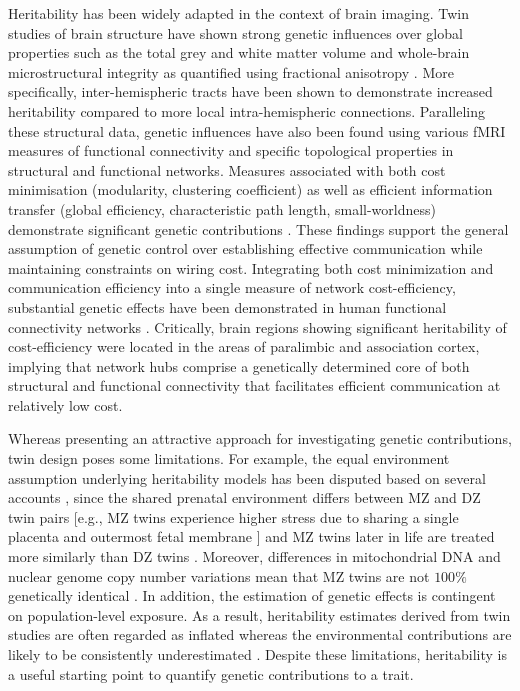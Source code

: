 Heritability has been widely adapted in the context of brain imaging. Twin studies of brain structure have shown strong genetic influences over global properties such as the total grey and white matter volume
\citep{Baare2001,Bohlken2014,Wright2002} and whole-brain microstructural integrity as quantified using fractional anisotropy \citep{Bohlken2014}. More specifically, inter-hemispheric tracts have been shown to demonstrate increased heritability \citep{Shen2014,Sudre2017} compared to more local intra-hemispheric connections. Paralleling these structural data, genetic influences have also been found using various fMRI measures of functional connectivity \citep{Colclough2017} \citep{Fu2015,Glahn2010,Sudre2017} and specific topological properties in structural \citep{Bohlken2014} and functional \citep{Fornito2011,Sinclair2015}  networks. Measures associated with both cost minimisation (modularity, clustering coefficient) as well as efficient information transfer (global efficiency, characteristic path length, small-worldness) demonstrate significant genetic contributions \citep{Sinclair2015,Bohlken2014}. These findings support the general assumption of genetic control over establishing effective communication while maintaining constraints on wiring cost. Integrating both cost minimization and communication efficiency into a single measure of network cost-efficiency, substantial genetic effects have been demonstrated in human functional connectivity networks \citep{Fornito2011}. Critically, brain regions showing significant heritability of cost-efficiency were located in the areas of paralimbic and association cortex, implying that network hubs comprise a genetically determined core of both structural and functional connectivity that facilitates efficient communication at relatively low cost.

Whereas presenting an attractive approach for investigating genetic contributions, twin design poses some limitations. For example, the equal environment assumption underlying heritability models has been disputed based on several accounts \citep{Charney2017,Joseph2002}, since the shared prenatal environment differs between MZ and DZ twin pairs [e.g., MZ twins experience higher stress due to sharing a single placenta and outermost fetal membrane \citep{Corsello2010}] and MZ twins later in life are treated more similarly than DZ twins \citep{Joseph2002}. Moreover, differences in mitochondrial DNA and nuclear genome copy number variations mean that MZ twins are not $100\%$ genetically identical \citep{Bruder2008,Charney2017}. In addition, the estimation of genetic effects is contingent on population-level exposure. As a result, heritability estimates derived from twin studies are often regarded as inflated whereas the environmental contributions are likely to be consistently underestimated \citep{Joseph2002}. Despite these limitations, heritability is a useful starting point to quantify genetic contributions to a trait.

